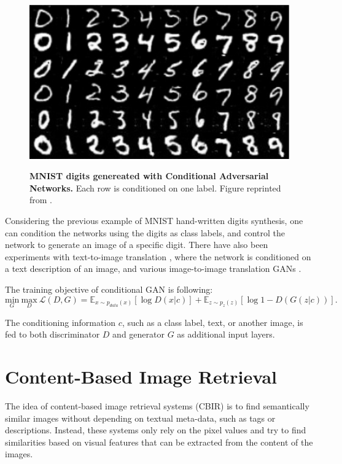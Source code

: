 \documentclass[12pt]{report}
\begin{document}
\begin{figure}[t]
\centering
{\includegraphics[width=.6\linewidth]{02_background/mnist_cgan2}}
\caption{\label{fig:cgan} \textbf{MNIST digits genereated with Conditional Adversarial Networks.} Each row is conditioned on one label. Figure reprinted from \cite{mirza_conditional_2014}.}
\end{figure}

Considering the previous example of MNIST hand-written digits synthesis, one can condition the networks using the digits as class labels, and control the network to generate an image of a specific digit. There have also been experiments with text-to-image translation \cite{reed_generative_2016}, where the network is conditioned on a text description of an image, and various image-to-image translation GANs \cite{isola_image--image_2016}\cite{zhu_unpaired_2017}\cite{choi_stargan_2017}.

The training objective of conditional GAN is following:
\begin{equation}
\underset{G}{\mathrm{min}} \ \underset{D}{\mathrm{max}} \ \mathcal{L}(D,G) = \mathbb{E}_{x \sim p_{data}(x)}[\log D(x|c)] + \mathbb{E}_{z \sim p_{z}(z)}[\log 1 - D(G(z|c))].
\label{eq:cgan}
\end{equation}

The conditioning information $c$, such as a class label, text, or another image, is fed to both discriminator $D$ and generator $G$ as additional input layers.


\section{Content-Based Image Retrieval}
The idea of content-based image retrieval systems (CBIR) is to find semantically similar images without depending on textual meta-data, such as tags or descriptions. Instead, these systems only rely on the pixel values and try to find similarities based on visual features that can be extracted from the content of the images.
\end{document}
